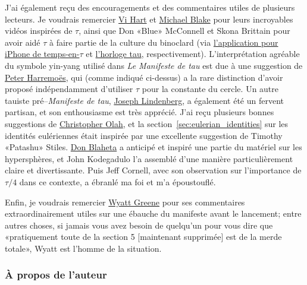 J'ai également reçu des encouragements et des commentaires utiles de plusieurs
lecteurs. Je voudrais remercier
\href{https://www.youtube.com/watch?v=jG7vhMMXagQ}{Vi Hart} et
\href{https://www.youtube.com/watch?v=3174T-3-59Q}{Michael Blake} pour leurs
incroyables vidéos inspirées de $\tau$, ainsi que Don «\ns Blue\ns » McConnell et
Skona Brittain pour avoir aidé $\tau$ à faire partie de la culture du binoclard
(via \href{http://tauclock.com/}{l'application pour iPhone de temps-en-$\tau$}
et
\href{https://translate.google.com/translate?hl=en&sl=en&tl=fr&u=http://www.sbcrafts.net/clocks/}{l'horloge
tau}, respectivement).
L'interprétation agréable du symbole yin-yang utilisé dans \emph{Le Manifeste de
tau} est due à une suggestion de
\href{https://translate.google.com/translate?hl=en&sl=en&tl=fr&u=http://www.harremoes.dk/Peter/}{Peter
Harremoës}, qui (comme indiqué ci-dessus) a la rare distinction d'avoir proposé
indépendamment d'utiliser $\tau$ pour la constante du cercle. Un autre tauiste
pré--\emph{Manifeste de tau},
\href{https://translate.google.com/translate?hl=en&sl=en&tl=fr&u=https://sites.google.com/site/taubeforeitwascool/}{Joseph
Lindenberg}, a
également été un fervent partisan, et son enthousiasme est très apprécié. J'ai
reçu plusieurs bonnes suggestions de
\href{https://translate.google.com/translate?hl=en&sl=en&tl=fr&u=https://christopherolah.wordpress.com/about-me}{Christopher
Olah}, et la
section~\ref{sec:eulerian_identities} sur les identités eulériennes était
inspirée par une excellente suggestion de Timothy «\ns Patashu\ns » Stiles.
\href{https://translate.google.com/translate?hl=en&sl=en&tl=fr&u=http://www.blahedo.org/blog/archives/001083.html}{Don
Blaheta} a anticipé
et inspiré une partie du matériel sur les hypersphères, et
John Kodegadulo l'a assemblé d'une manière
particulièrement claire et divertissante. Puis Jeff Cornell, avec son
observation sur l'importance de $\tau/4$ dans ce contexte, a ébranlé ma foi et
m'a époustouflé.

Enfin, je voudrais remercier \href{https://techiferous.com/}{Wyatt Greene} pour
ses commentaires extraordinairement utiles sur une ébauche du manifeste avant le
lancement\ns; entre autres choses, si jamais vous avez besoin de quelqu'un pour
vous dire que «\ns pratiquement toute de la section 5 [maintenant supprimée] est
de la merde totale\ns », Wyatt est l'homme de la situation.



    \subsubsection{À propos de l'auteur} %
    \label{sec:about_the_author}

